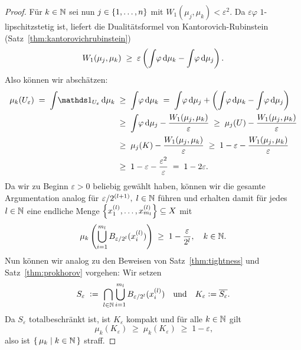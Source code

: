 \documentclass[../main/main.tex]{subfiles}
\begin{document}
\begin{proof}
		Für  $k \in \mathbb{N}$ sei nun $j \in \left\{1, \dots, n\right\}$ mit $W_1(\mu_j, \mu_k) < \varepsilon^2$. Da $\varepsilon\varphi$ $1$-lipschitzstetig ist, liefert die 
		Dualitätsformel von Kantorovich-Rubinstein (Satz~\ref{thm:kantorovichrubinstein})
		\[ W_1(\mu_j, \mu_k) \; \geq \; \varepsilon \left( \int_{} \, \varphi \, \mathrm{d}\mu_k - \int_{} \, \varphi \, \mathrm{d}\mu_j \right) \text{.} \]
		Also können wir abschätzen:
		\begin{align*}
			\mu_k(U_\varepsilon) \; = \; \measureint{}{\indfct_{U_\varepsilon}}{\mu_k} \; &\geq \; \measureint{}{\varphi}{\mu_k} \; = \; \measureint{}{\varphi}{\mu_j} + \left( \measureint{}{\varphi}{\mu_k} - \measureint{}{\varphi}{\mu_j} \right) \\
			                                                                              &\geq \; \measureint{}{\varphi}{\mu_j} - \frac{W_1(\mu_j, \mu_k)}{\varepsilon} \; \geq \; \mu_j(U) - \frac{W_1(\mu_j, \mu_k)}{\varepsilon} \\
			                                                                              &\geq \; \mu_j(K) - \frac{W_1(\mu_j, \mu_k)}{\varepsilon} \; \geq \; 1 - \varepsilon - \frac{W_1(\mu_j, \mu_k)}{\varepsilon} \\
			                                                                              &\geq \; 1 - \varepsilon - \frac{\varepsilon^2}{\varepsilon} \; = \; 1 - 2\varepsilon \text{.}
		\end{align*}
		Da wir zu Beginn $\varepsilon > 0$ beliebig gewählt haben, können wir die gesamte Argumentation analog für $\varepsilon/2^{(l+1)}, \; l \in \mathbb{N}$ führen und erhalten damit für jedes $l \in \mathbb{N}$ 
		eine endliche Menge $\left\{x_1^{(l)}, \dots, x_{m_l}^{(l)}\right\} \subseteq X$ mit
		\[ \mu_k \left( \bigcup_{i=1}^{m_l} B_{\varepsilon/2^l}(x_i^{(l)}) \right) \; \geq \; 1 - \frac{\varepsilon}{2^l}, \quad k \in \mathbb{N} \text{.} \]
		Nun können wir analog zu den Beweisen von Satz~\ref{thm:tightness} und Satz~\ref{thm:prokhorov} vorgehen:
		Wir setzen
		\[ S_{\varepsilon} \; \vcentcolon = \; \bigcap_{l \in \mathbb{N}} \bigcup_{i=1}^{m_l} B_{\varepsilon/2^l}(x_i^{(l)}) \quad \text{und} \quad K_{\varepsilon} \vcentcolon = \overline{S_\varepsilon} \text{.} \]
		Da $S_{\varepsilon}$ totalbeschränkt ist, ist $K_{\varepsilon}$ kompakt und für alle $k \in \mathbb{N}$ gilt
		\[ \mu_k(K_{\varepsilon}) \; \geq \; \mu_k(K_{\varepsilon}) \; \geq \; 1 - \varepsilon \text{,} \]
		also ist $\left\{\, \mu_k \; \middle| \; k \in \mathbb{N} \,\right\}$ straff.
	\end{proof}
\end{document}
